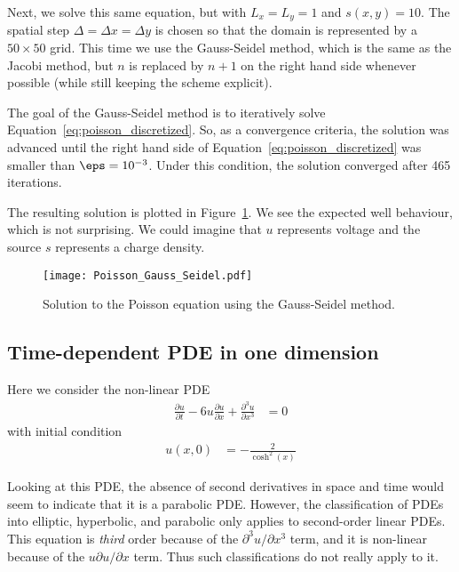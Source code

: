 \documentclass[twocolumn]{myarticle}
\numberwithin{equation}{section}
\begin{document}
Next, we solve this same equation, but with $ L_x = L_y = 1 $ and $ s(x,y) = 10 $.
The spatial step $ \Delta = \Delta x = \Delta y $ is chosen so that the domain is represented by a $ 50 \times 50 $ grid.
This time we use the Gauss-Seidel method, which is the same as the Jacobi method, but $ n $ is replaced by $ n + 1 $ on the right hand side whenever possible (while still keeping the scheme explicit).

The goal of the Gauss-Seidel method is to iteratively solve Equation~\ref{eq:poisson_discretized}.
So, as a convergence criteria, the solution was advanced until the right hand side of Equation~\ref{eq:poisson_discretized} was smaller than $ \eps = 10^{-3} $.
Under this condition, the solution converged after 465 iterations.

The resulting solution is plotted in Figure~\ref{fig:gauss_seidel}.
We see the expected well behaviour, which is not surprising.
We could imagine that $ u $ represents voltage and the source $ s $ represents a charge density.

\begin{figure}[ht]
    \centering
    \texttt{[image: Poisson\_Gauss\_Seidel.pdf]}
    \caption{Solution to the Poisson equation using the Gauss-Seidel method.}
    \label{fig:gauss_seidel}
\end{figure}

\subsection{Time-dependent PDE in one dimension}
\label{subsec:time_dependent_pde_in_one_dimension}

Here we consider the non-linear PDE
\begin{align}
    \frac{\partial u}{\partial t} - 6 u \frac{\partial u}{\partial x} + \frac{\partial^3 u}{\partial x^3} &= 0
\end{align}
with initial condition
\begin{align}
    u(x,0) &= - \frac{2}{\cosh^2(x)}
\end{align}

Looking at this PDE, the absence of second derivatives in space and time would seem to indicate that it is a parabolic PDE.
However, the classification of PDEs into elliptic, hyperbolic, and parabolic only applies to second-order linear PDEs.
This equation is \emph{third} order because of the $ \partial^3 u / \partial x^3 $ term, and it is non-linear because of the $ u \partial u / \partial x $ term.
Thus such classifications do not really apply to it.
\end{document}
